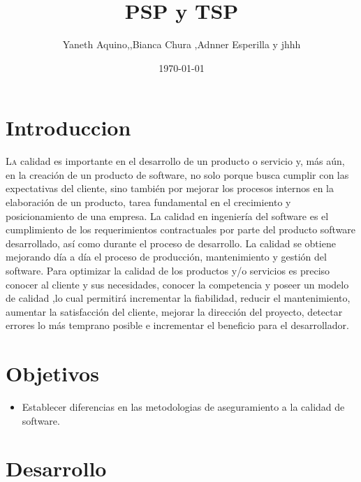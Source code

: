 \documentclass[twoside,twocolumn]{article}
\title{ PSP y TSP} %
\author{Yaneth Aquino,,Bianca Chura ,Adnner Esperilla y jhhh}
\date{\today} %
\begin{document}
\maketitle


\section{Introduccion}

\lettrine[nindent=0em,lines=3]{L}a calidad es importante en el desarrollo de un producto o servicio y, más aún, en la creación de un producto de software, no solo porque busca cumplir con las expectativas del cliente, sino también por mejorar los procesos internos en la elaboración de un producto, tarea fundamental en el crecimiento y posicionamiento de una empresa.
La calidad en ingeniería del software es el cumplimiento de los requerimientos contractuales por parte del producto software desarrollado, así como durante el proceso de desarrollo. La calidad se obtiene mejorando día a día el proceso de producción, mantenimiento y gestión del software.
 Para optimizar la calidad de los productos y/o servicios es preciso conocer al cliente y sus necesidades, conocer la competencia y poseer un modelo de calidad ,lo cual permitirá incrementar la fiabilidad, reducir el mantenimiento, aumentar la satisfacción del cliente, mejorar la dirección del proyecto, detectar errores lo más temprano posible e incrementar el beneficio para el desarrollador. 

\section{Objetivos}
\begin{itemize}
\item Establecer diferencias en las  metodologias de aseguramiento a la calidad de software.

\end{itemize}

\section{Desarrollo}
\end{document}
